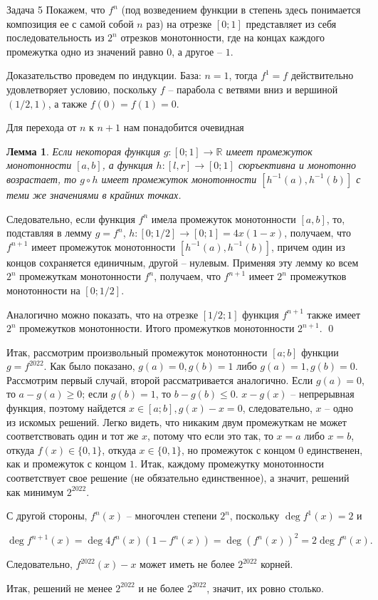 \documentclass{article}
\newtheorem{lemma}{Лемма}
\begin{document}
	\begin{section}{Задача 5}
		Покажем, что $f^n$ (под возведением функции в степень здесь понимается композиция ее с самой собой $n$ раз) на отрезке $[0; 1]$ представляет из себя последовательность из $2^n$ отрезков монотонности, где на концах каждого промежутка одно из значений равно $0$, а другое -- $1$.

		Доказательство проведем по индукции. База: $n = 1$, тогда $f^1 = f$ действительно удовлетворяет условию, поскольку $f$ -- парабола с ветвями вниз и вершиной $(1/2, 1)$, а также $f(0) = f(1) = 0$.

		Для перехода от $n$ к $n + 1$ нам понадобится очевидная

		\begin{lemma}
			Если некоторая функция $g: [0; 1] \to \mathbb{R}$ имеет промежуток монотонности $[a, b]$, а функция $h: [l, r] \to [0; 1]$ сюръективна и монотонно возрастает, то $g \circ h$ имеет промежуток монотонности $[h^{-1}(a), h^{-1}(b)]$ с теми же значениями в крайних точках.
		\end{lemma}

		Следовательно, если функция $f^n$ имела промежуток монотонности $[a, b]$, то, подставляя в лемму $g = f^n$, $h: [0; 1/2] \to [0; 1] = 4x(1-x)$, получаем, что $f^{n+1}$ имеет промежуток монотонности $[h^{-1}(a), h^{-1}(b)]$, причем один из концов сохраняется единичным, другой -- нулевым. Применяя эту лемму ко всем $2^n$ промежуткам монотонности $f^n$, получаем, что $f^{n+1}$ имеет $2^n$ промежутков монотонности на $[0; 1/2]$.

		Аналогично можно показать, что на отрезке $[1/2; 1]$ функция $f^{n+1}$ также имеет $2^n$ промежутков монотонности. Итого промежутков монотонности $2^{n+1}$. \qed

		Итак, рассмотрим произвольный промежуток монотонности $[a; b]$ функции $g = f^{2022}$. Как было показано, $g(a) = 0, g(b) = 1$ либо $g(a) = 1, g(b) = 0$. Рассмотрим первый случай, второй рассматривается аналогично. Если $g(a) = 0$, то $a - g(a) \ge 0$; если $g(b) = 1$, то $b - g(b) \le 0$. $x - g(x)$ -- непрерывная функция, поэтому найдется $x \in [a; b], g(x) - x = 0$, следовательно, $x$ -- одно из искомых решений. Легко видеть, что никаким двум промежуткам не может соответствовать один и тот же $x$, потому что если это так, то $x = a$ либо $x = b$, откуда $f(x) \in \{0, 1\}$, откуда $x \in \{0, 1\}$, но промежуток с концом $0$ единственен, как и промежуток с концом $1$. Итак, каждому промежутку монотонности соответствует свое решение (не обязательно единственное), а значит, решений как минимум $2^{2022}$.

		С другой стороны, $f^n(x)$ -- многочлен степени $2^n$, поскольку $\deg f^1(x) = 2$ и

		\begin{equation*}
			\deg f^{n+1}(x) = \deg 4 f^n(x) (1 - f^n(x)) = \deg (f^n(x))^2 = 2 \deg f^n(x).
		\end{equation*}

		Следовательно, $f^{2022}(x) - x$ может иметь не более $2^{2022}$ корней.

		Итак, решений не менее $2^{2022}$ и не более $2^{2022}$, значит, их ровно столько.
	\end{section}
\end{document}
